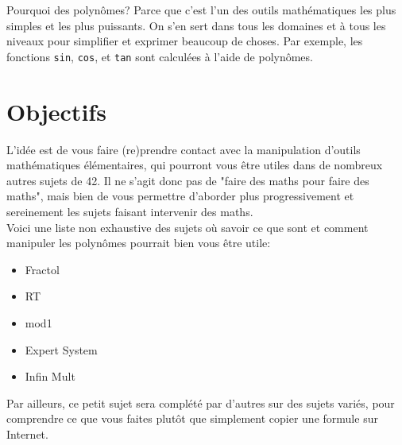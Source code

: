 \documentclass{42}
\begin{document}
    Pourquoi des polynômes? Parce que c'est l'un des outils
    mathématiques les plus simples et les plus puissants. On s'en sert
    dans tous les domaines et à tous les niveaux pour simplifier et
    exprimer beaucoup de choses. Par exemple, les fonctions
    \texttt{sin}, \texttt{cos}, et \texttt{tan} sont calculées à
    l'aide de polynômes.




\chapter{Objectifs}

    L’idée est de vous faire (re)prendre contact avec la manipulation
    d'outils mathématiques élémentaires, qui pourront vous être utiles
    dans de nombreux autres sujets de 42. Il ne s'agit donc pas de
    "faire des maths pour faire des maths", mais bien de vous
    permettre d'aborder plus progressivement et sereinement les sujets
    faisant intervenir des maths.\\

    Voici une liste non exhaustive des sujets où savoir ce que sont et
    comment manipuler les polynômes pourrait bien vous être utile:\\

	\begin{itemize}\itemsep1pt
        \item Fractol
	    \item RT
	    \item mod1
	    \item Expert System
	    \item Infin Mult\\
    \end{itemize}

    Par ailleurs, ce petit sujet sera complété par d'autres sur des
    sujets variés, pour comprendre ce que vous faites plutôt que
    simplement copier une formule sur Internet.
\end{document}

